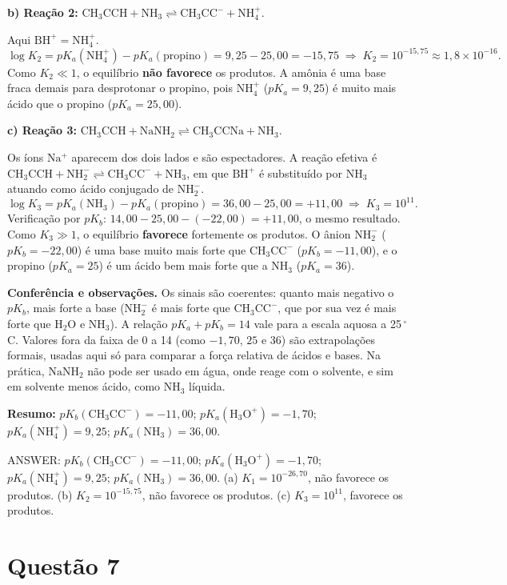 \documentclass{article}%
\begin{document}
\textbf{b) Reação 2:} $\mathrm{CH_3CCH+NH_3\rightleftharpoons CH_3CC^-+NH_4^+}$.

Aqui $\mathrm{BH^+}=\mathrm{NH_4^+}$.
\[
\log K_2=pK_a(\mathrm{NH_4^+})-pK_a(\mathrm{propino})=9{,}25-25{,}00=-15{,}75
\;\Rightarrow\; K_2=10^{-15,75}\approx 1{,}8\times10^{-16}.
\]
Como $K_2\ll1$, o equilíbrio \textbf{não favorece} os produtos. A amônia é uma base fraca demais para desprotonar o propino, pois $\mathrm{NH_4^+}$ ($pK_a=9{,}25$) é muito mais ácido que o propino ($pK_a=25{,}00$).

\textbf{c) Reação 3:} $\mathrm{CH_3CCH+NaNH_2\rightleftharpoons CH_3CCNa+NH_3}$.

Os íons $\mathrm{Na^+}$ aparecem dos dois lados e são espectadores. A reação efetiva é $\mathrm{CH_3CCH+NH_2^-\rightleftharpoons CH_3CC^-+NH_3}$, em que $\mathrm{BH^+}$ é substituído por $\mathrm{NH_3}$ atuando como ácido conjugado de $\mathrm{NH_2^-}$.
\[
\log K_3=pK_a(\mathrm{NH_3})-pK_a(\mathrm{propino})=36{,}00-25{,}00=+11{,}00
\;\Rightarrow\; K_3=10^{11}.
\]
Verificação por $pK_b$: $14{,}00-25{,}00-(-22{,}00)=+11{,}00$, o mesmo resultado. Como $K_3\gg1$, o equilíbrio \textbf{favorece} fortemente os produtos. O ânion $\mathrm{NH_2^-}$ ($pK_b=-22{,}00$) é uma base muito mais forte que $\mathrm{CH_3CC^-}$ ($pK_b=-11{,}00$), e o propino ($pK_a=25$) é um ácido bem mais forte que a $\mathrm{NH_3}$ ($pK_a=36$).

\textbf{Conferência e observações.} Os sinais são coerentes: quanto mais negativo o $pK_b$, mais forte a base ($\mathrm{NH_2^-}$ é mais forte que $\mathrm{CH_3CC^-}$, que por sua vez é mais forte que $\mathrm{H_2O}$ e $\mathrm{NH_3}$). A relação $pK_a+pK_b=14$ vale para a escala aquosa a 25\,$^\circ$C. Valores fora da faixa de 0 a 14 (como $-1{,}70$, $25$ e $36$) são extrapolações formais, usadas aqui só para comparar a força relativa de ácidos e bases. Na prática, $\mathrm{NaNH_2}$ não pode ser usado em água, onde reage com o solvente, e sim em solvente menos ácido, como $\mathrm{NH_3}$ líquida.

\textbf{Resumo:} $pK_b(\mathrm{CH_3CC^-})=-11{,}00$; $pK_a(\mathrm{H_3O^+})=-1{,}70$; $pK_a(\mathrm{NH_4^+})=9{,}25$; $pK_a(\mathrm{NH_3})=36{,}00$.

ANSWER: $pK_b(\mathrm{CH_3CC^-})=-11{,}00$; $pK_a(\mathrm{H_3O^+})=-1{,}70$; $pK_a(\mathrm{NH_4^+})=9{,}25$; $pK_a(\mathrm{NH_3})=36{,}00$. (a) $K_1=10^{-26,70}$, não favorece os produtos. (b) $K_2=10^{-15,75}$, não favorece os produtos. (c) $K_3=10^{11}$, favorece os produtos.%
\newpage%
\section*{Questão 7}
\end{document}

